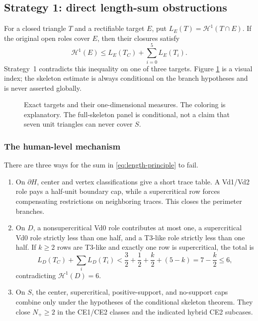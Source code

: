 \subsection{Strategy 1: direct length-sum obstructions}
\label{subsec:length-guide}

For a closed triangle $T$ and a rectifiable target $E$, put
$L_E(T)=\mathcal H^1(T\cap E)$.  If the original open roles cover $E$,
then their closures satisfy
\begin{equation}
 \mathcal H^1(E)\le L_E(T_C)+\sum_{i=0}^5L_E(T_i).
 \label{eq:length-principle}
\end{equation}
Strategy~1 contradicts this inequality on one of three targets.  Figure
\ref{fig:strategy1-targets} is a visual index; the skeleton estimate is
always conditional on the branch hypotheses and is never asserted globally.

\begin{figure}[H]
\centering

\caption{Exact targets and their one-dimensional measures.  The coloring is
explanatory.  The full-skeleton panel is conditional, not a claim that seven
unit triangles can never cover $S$.}
\label{fig:strategy1-targets}
\end{figure}

\subsubsection{The human-level mechanism}

There are three ways for the sum in \eqref{eq:length-principle} to fail.

\begin{enumerate}
\item On $\partial H$, center and vertex classifications give a short trace
table.  A Vd1/Vd2 role pays a half-unit boundary cap, while a supercritical
row forces compensating restrictions on neighboring traces.  This closes
the perimeter branches.
\item On $D$, a nonsupercritical Vd0 role contributes at most one, a
supercritical Vd0 role strictly less than one half, and a T3-like role
strictly less than one half.  If $k\ge2$ rows are T3-like and exactly one
row is supercritical, the total is
\[
 L_D(T_C)+\sum_iL_D(T_i)
 <\frac32+\frac12+\frac{k}{2}+(5-k)
 =7-\frac{k}{2}\le6,
\]
contradicting $\mathcal H^1(D)=6$.
\item On $S$, the center, supercritical, positive-support, and no-support
caps combine only under the hypotheses of the conditional skeleton theorem.
They close $N_+\ge2$ in the CE1/CE2 classes and the indicated hybrid CE2
subcases.
\end{enumerate}

